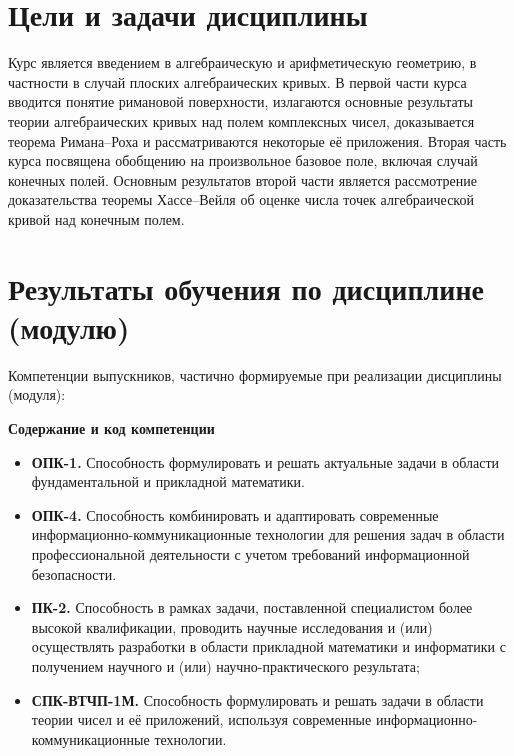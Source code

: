 \documentclass[a4paper, 12pt]{article}
\begin{document}
\section{Цели и задачи дисциплины}

Курс является введением в алгебраическую и арифметическую геометрию, в частности в случай плоских алгебраических кривых. В первой части курса вводится понятие римановой поверхности, излагаются основные результаты теории алгебраических кривых над полем комплексных чисел, доказывается теорема Римана--Роха и рассматриваются некоторые её приложения. Вторая часть курса посвящена обобщению на произвольное базовое поле, включая случай конечных полей. Основным результатов второй части является рассмотрение доказательства теоремы Хассе–Вейля об оценке числа точек алгебраической кривой над конечным полем.

\section{Результаты обучения по дисциплине (модулю)}

Компетенции выпускников, частично формируемые при реализации дисциплины (модуля):

{\bf Содержание и код компетенции}
\begin{itemize}[noitemsep,topsep=0pt]
    \item {\bf ОПК-1.} Способность формулировать и решать актуальные задачи в области фундаментальной и прикладной математики.
    
    \item {\bf ОПК-4.} Способность комбинировать и адаптировать современные ин\-фор\-ма\-ци\-онно-комму\-ни\-ка\-ци\-онные технологии для решения задач в области профессиональной деятельности с учетом требований информационной безопасности.
    
    \item {\bf ПК-2.} Способность в рамках задачи, поставленной специалистом более высокой квалификации, проводить научные исследования и (или) осуществлять разработки в области прикладной математики и информатики с получением научного и (или) научно-практического результата;
    
    \item {\bf СПК-ВТЧП-1М.} Способность формулировать и решать задачи в области теории чисел и её приложений, используя современные ин\-фор\-ма\-ци\-онно-комму\-ни\-ка\-ци\-онные технологии.
\end{itemize}
\end{document}
